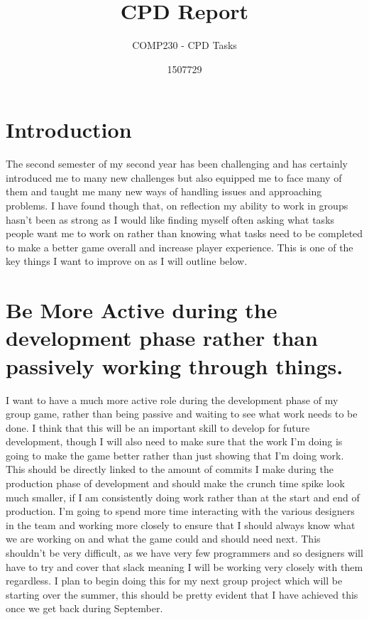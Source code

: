 \documentclass{scrartcl}
\title{CPD Report}
\subtitle{COMP230 - CPD Tasks}
\author{1507729}
\begin{document}
\maketitle

\section*{Introduction}

The second semester of my second year has been challenging and has certainly introduced me to many new challenges but also equipped me to face many of them and taught me many new ways of handling issues and approaching problems. I have found though that, on reflection my ability to work in groups hasn't been as strong as I would like finding myself often asking what tasks people want me to work on rather than knowing what tasks need to be completed to make a better game overall and increase player experience. This is one of the key things I want to improve on as I will outline below.

\section{Be More Active during the development phase rather than passively working through things.}

I want to have a much more active role during the development phase of my group game, rather than being passive and waiting to see what work needs to be done. I think that this will be an important skill to develop for future development, though I will also need to make sure that the work I'm doing is going to make the game better rather than just showing that I'm doing work. This should be directly linked to the amount of commits I make during the production phase of development and should make the crunch time spike look much smaller, if I am consistently doing work rather than at the start and end of production. I'm going to spend more time interacting with the various designers in the team and working more closely to ensure that I should always know what we are working on and what the game could and should need next. This shouldn't be very difficult, as we have very few programmers and so designers will have to try and cover that slack meaning I will be working very closely with them regardless. I plan to begin doing this for my next group project which will be starting over the summer, this should be pretty evident that I have achieved this once we get back during September.
\end{document}

